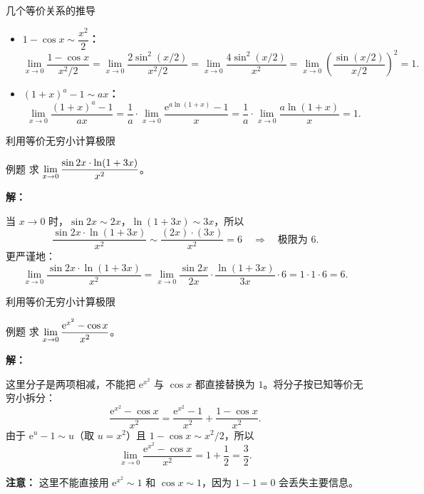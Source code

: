 \documentclass[aspectratio=169,10pt]{ctexbeamer}
\newcommand{\ee}{\mathrm{e}}
\begin{document}
\begin{frame}{几个等价关系的推导}
	\begin{itemize}
	\item \textbf{\(1 - \cos x \sim \dfrac{x^2}{2}\)：} 
	\[
	\lim\limits_{x \to 0} \dfrac{1 - \cos x}{x^2/2} = \lim\limits_{x \to 0} \dfrac{2 \sin^2(x/2)}{x^2/2} = \lim\limits_{x \to 0} \dfrac{4 \sin^2(x/2)}{x^2} = \lim\limits_{x \to 0} \left(\dfrac{\sin(x/2)}{x/2}\right)^2 = 1.
	\]
	
	\item \textbf{\((1+x)^a - 1 \sim ax\)：} 
	\[
	\lim\limits_{x \to 0} \dfrac{(1+x)^a - 1}{ax} = \dfrac{1}{a} \cdot \lim\limits_{x \to 0} \dfrac{\ee^{a\ln(1+x)} - 1}{x} = \dfrac{1}{a} \cdot \lim\limits_{x \to 0} \dfrac{a\ln(1+x)}{x} = 1.
	\]
	\end{itemize}
\end{frame}


\begin{frame}{利用等价无穷小计算极限}
	\begin{block}{例题}
		求 \(\lim\limits\limits_{x \to 0} \dfrac{\sin 2x \cdot \ln(1+3x)}{x^2}\)。
	\end{block}
	

	
	\pause
	
		\vspace{0.5cm}
		
	\textbf{解：}
	
	当 \(x \to 0\) 时，\(\sin 2x \sim 2x\)，\(\ln(1+3x) \sim 3x\)，所以
	\[
	\dfrac{\sin 2x \cdot \ln(1+3x)}{x^2} \sim \dfrac{(2x) \cdot (3x)}{x^2} = 6 \quad \Rightarrow \quad \text{极限为 } 6.
	\]
	更严谨地：
	\[
	\lim\limits_{x \to 0} \dfrac{\sin 2x \cdot \ln(1+3x)}{x^2} = \lim\limits_{x \to 0} \dfrac{\sin 2x}{2x} \cdot \dfrac{\ln(1+3x)}{3x} \cdot 6 = 1 \cdot 1 \cdot 6 = 6.
	\]
	
	
	
\end{frame}



\begin{frame}{利用等价无穷小计算极限}
	\begin{block}{例题}
		求 \(\lim\limits\limits_{x \to 0} \dfrac{\ee^{x^2} - \cos x}{x^2}\)。
	\end{block}
	
	
	
	\pause
	
	\vspace{0.5cm}
	
	\textbf{解：}
	
	这里分子是两项相减，不能把 \(\ee^{x^2}\) 与 \(\cos x\) 都直接替换为 \(1\)。将分子按已知等价无穷小拆分：
	\[
	\frac{\ee^{x^2}-\cos x}{x^2}
	=\frac{\ee^{x^2}-1}{x^2}+\frac{1-\cos x}{x^2}.
	\]
	由于 \(\ee^u-1\sim u\)（取 \(u=x^2\)）且 \(1-\cos x\sim x^2/2\)，所以
	\[
	\lim\limits_{x\to0}\frac{\ee^{x^2}-\cos x}{x^2}
	=1+\frac12=\frac32.
	\]
	
	\textbf{注意：} 这里不能直接用 \(\ee^{x^2}\sim1\) 和 \(\cos x\sim1\)，因为 \(1-1=0\) 会丢失主要信息。
	
	
	
	
\end{frame}
\end{document}

